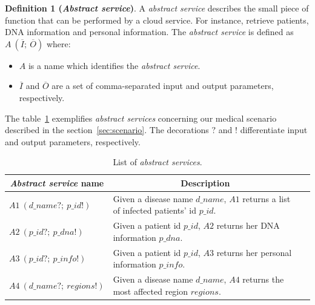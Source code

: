 \bigskip

\noindent \textbf{Definition 1 (\textit{Abstract service})}. A \textit{abstract service} describes the small piece of function that can be performed by a cloud service. For instance, retrieve patients, DNA information and personal information. The \textit{abstract service} is defined as $A \ (\overline{I}; \ \overline{O})$ where: 
\begin{itemize}
\item $A$ is a name which identifies the \textit{abstract service}.
\item $\overline{I}$ and $\overline{O}$ are a set of comma-separated input and output parameters, respectively.
\end{itemize}
The table~\ref{table:abstractservices} exemplifies \textit{abstract services} concerning our medical scenario described in the section~\ref{sec:scenario}. The decorations $?$ and $!$ differentiate input and output parameters, respectively. 
%
%
\begin{table}[]
\centering
\begin{tabular}{|l|p{8cm}|l|}
\hline
\multicolumn{1}{|c|}{\textbf{\textit{Abstract service} name}} & \multicolumn{1}{c|}{\textbf{Description}} \\ \hline
$A1 \ (d\_name?; \ p\_id!)$ & Given a disease name $d\_name$, $A1$ returns a list of infected patients' id $p\_id$. \\ \hline
$A2 \ (p\_id?; \ p\_dna!)$ & Given a patient id $p\_id$, $A2$ returns her DNA information $p\_dna$. \\ \hline
$A3 \ (p\_id?; \ p\_info!)$ & Given a patient id $p\_id$, $A3$ returns her personal information $p\_info$.\\ \hline
$A4 \ (d\_name?; \ regions!)$ & Given a disease name $d\_name$, $A4$ returns the most affected region $regions$. \\ \hline
\end{tabular}
\caption{List of \textit{abstract services}.}
\label{table:abstractservices}
\end{table}
\bigskip

